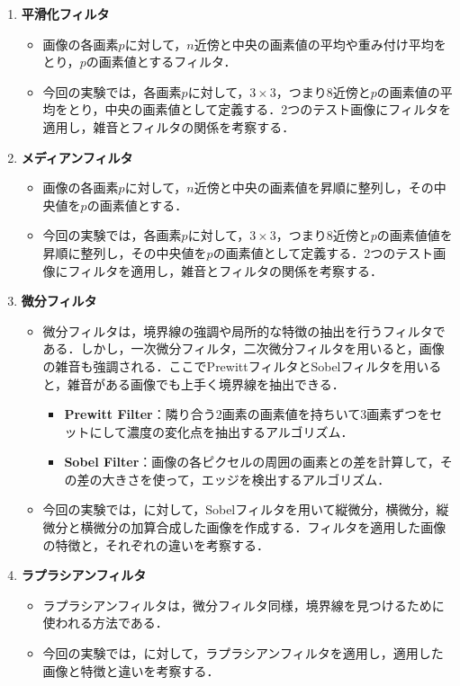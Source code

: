 \begin{enumerate}
    \item \textbf{平滑化フィルタ}
          \begin{itemize}
              \item 画像の各画素\(p\)に対して，\(n\)近傍と中央の画素値の平均や重み付け平均をとり，\(p\)の画素値とするフィルタ．
              \item 今回の実験では，各画素\(p\)に対して，\(3\times 3\)，つまり8近傍と\(p\)の画素値の平均をとり，中央の画素値として定義する．2つのテスト画像にフィルタを適用し，雑音とフィルタの関係を考察する．
          \end{itemize}
    \item \textbf{メディアンフィルタ}
          \begin{itemize}
              \item 画像の各画素\(p\)に対して，\(n\)近傍と中央の画素値を昇順に整列し，その中央値を\(p\)の画素値とする．
              \item 今回の実験では，各画素\(p\)に対して，\(3\times 3\)，つまり8近傍と\(p\)の画素値値を昇順に整列し，その中央値を\(p\)の画素値として定義する．2つのテスト画像にフィルタを適用し，雑音とフィルタの関係を考察する．
          \end{itemize}
    \item \textbf{微分フィルタ}
          \begin{itemize}
              \item 微分フィルタは，境界線の強調や局所的な特徴の抽出を行うフィルタである．しかし，一次微分フィルタ，二次微分フィルタを用いると，画像の雑音も強調される．ここでPrewittフィルタとSobelフィルタを用いると，雑音がある画像でも上手く境界線を抽出できる\cite[p.87]{画像処理}．
                    \begin{itemize}
                        \item \textbf{Prewitt Filter}：隣り合う2画素の画素値を持ちいて3画素ずつをセットにして濃度の変化点を抽出するアルゴリズム\cite[p.87]{画像処理}．
                        \item \textbf{Sobel Filter}：画像の各ピクセルの周囲の画素との差を計算して，その差の大きさを使って，エッジを検出するアルゴリズム．
                    \end{itemize}
              \item 今回の実験では，\originimg に対して，Sobelフィルタを用いて縦微分，横微分，縦微分と横微分の加算合成した画像を作成する．フィルタを適用した画像の特徴と，それぞれの違いを考察する．
          \end{itemize}
    \item \textbf{ラプラシアンフィルタ}
          \begin{itemize}
              \item ラプラシアンフィルタは，微分フィルタ同様，境界線を見つけるために使われる方法である．
              \item 今回の実験では，\originimg に対して，ラプラシアンフィルタを適用し，適用した画像と特徴と違いを考察する．
          \end{itemize}
\end{enumerate}
